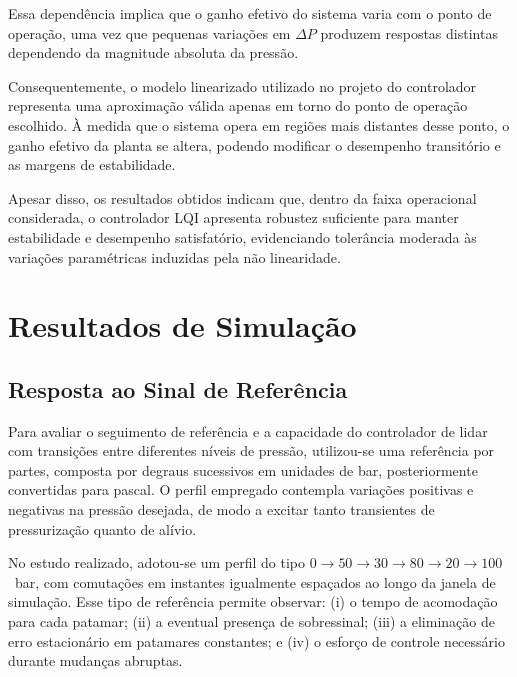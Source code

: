 Essa dependência implica que o ganho efetivo do sistema varia com o ponto de operação, uma vez que pequenas variações em $\Delta P$ produzem respostas distintas dependendo da magnitude absoluta da pressão.

Consequentemente, o modelo linearizado utilizado no projeto do controlador representa uma aproximação válida apenas em torno do ponto de operação escolhido. À medida que o sistema opera em regiões mais distantes desse ponto, o ganho efetivo da planta se altera, podendo modificar o desempenho transitório e as margens de estabilidade.

Apesar disso, os resultados obtidos indicam que, dentro da faixa operacional considerada, o controlador LQI apresenta robustez suficiente para manter estabilidade e desempenho satisfatório, evidenciando tolerância moderada às variações paramétricas induzidas pela não linearidade.

\section{Resultados de Simulação}
\label{sec:resultados-simulacao}

\subsection{Resposta ao Sinal de Referência}
\label{sec:resposta-sinal-referencia}

Para avaliar o seguimento de referência e a capacidade do controlador de lidar com transições entre diferentes níveis de pressão, utilizou-se uma referência por partes, composta por degraus sucessivos em unidades de bar, posteriormente convertidas para pascal. O perfil empregado contempla variações positivas e negativas na pressão desejada, de modo a excitar tanto transientes de pressurização quanto de alívio.

No estudo realizado, adotou-se um perfil do tipo $0\rightarrow 50\rightarrow 30\rightarrow 80\rightarrow 20\rightarrow 100$~bar, com comutações em instantes igualmente espaçados ao longo da janela de simulação. Esse tipo de referência permite observar: (i) o tempo de acomodação para cada patamar; (ii) a eventual presença de sobressinal; (iii) a eliminação de erro estacionário em patamares constantes; e (iv) o esforço de controle necessário durante mudanças abruptas.

